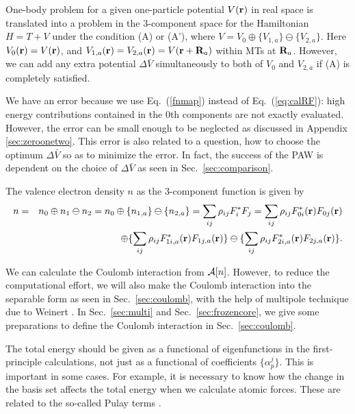 \documentclass[twocolumn,showpacs,preprintnumbers,amsmath,amssymb,floatfix]{revtex4-1}
\newcommand{\bfr}{{\bf r}}
\newcommand{\bfR}{{\bf R}}
\newcommand{\ooplus}{\oplus}
\newcommand{\oominus}{\ominus}
\def\calR{{\cal A}}
\newcommand{\req}[1]{\mbox{Eq.~\!(\ref{#1})}}
\newcommand{\refsec}[1]{\mbox{Sec.~\!\ref{#1}}}
\def\rhoij{\rho_{ij}}
\def\rhoij{\rho_{ij}}
\begin{document}
\begin{widetext}
One-body problem for a given one-particle potential $V(\bfr)$ in real
space is translated into a problem in the 3-component space for the
Hamiltonian $H=T+V$ under the condition (A) or (A'), where $V=V_0 \oplus
\{V_{1,a}\} \ominus \{V_{2,a}\}$.  Here $V_0(\bfr)=V(\bfr)$, and
$V_{1,a}(\bfr)=V_{2,a}(\bfr)=V(\bfr+\bfR_a)$ within MTs at
$\bfR_a$. However, we can add any extra potential $\Delta \bar{V}$
simultaneously to both of $V_0$ and $V_{2,a}$ if (A) is completely
satisfied.

We have an error because we use \req{fnmap} instead of \req{eq:calRF}:
high energy contributions contained in the 0th components are not
exactly evaluated. However, the error can be small enough to be
neglected as discussed in Appendix \ref{sec:zeroonetwo}.  This error is
also related to a question, how to choose the optimum $\Delta \bar{V}$
so as to minimize the error.  In fact, the success of the PAW \cite{PAW}
is dependent on the choice of $\Delta \bar{V}$ as seen in
\refsec{sec:comparison}.

The valence electron density $n$ as the 3-component function is given by
\begin{eqnarray}
n &=&n_0\ooplus n_1 \oominus n_2 = n_0 \ooplus \{n_{1,a}\} \oominus \{n_{2,a}\} =
\sum_{ij} \rhoij F_i^* F_j = \sum_{ij}
 \rhoij F^*_{0i}(\bfr)F_{0j}(\bfr) \nonumber \\
&&\ooplus  \{ \sum_{ij} \rhoij F^*_{1i,a}(\bfr)F_{1j,a}(\bfr) \}
\oominus   \{ \sum_{ij} \rhoij F^*_{2i,a}(\bfr)F_{2j,a}(\bfr) \}. \label{eq:n}
\end{eqnarray}
\end{widetext}
We can calculate the Coulomb interaction from $\calR[n]$. 
However, to reduce the computational effort, 
we will also make the Coulomb interaction into the separable form as
seen in \refsec{sec:coulomb}, with the help of multipole technique
due to Weinert \cite{weinert81}.
In \refsec{sec:multi} and \refsec{sec:frozencore}, we give some
preparations to define the Coulomb interaction in \refsec{sec:coulomb}.

The total energy should be given as a functional of eigenfunctions in
the first-principle calculations, not just as a functional of
coefficients $\{\alpha^j_p\}$.  This is important in some cases. For
example, it is necessary to know how the change in the basis set affects
the total energy when we calculate atomic forces. These are related to
the so-called Pulay terms \cite{pulay69}.
\end{document}

